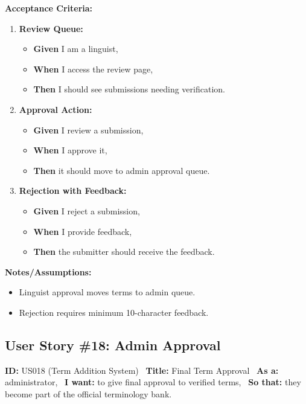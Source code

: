 \documentclass[12pt]{article}
\begin{document}
\vspace{1em}
\textbf{Acceptance Criteria:}
\begin{enumerate}
\item \textbf{Review Queue:}
\begin{itemize}
\item \textbf{Given} I am a linguist,
\item \textbf{When} I access the review page,
\item \textbf{Then} I should see submissions needing verification.
\end{itemize}

\item \textbf{Approval Action:}
\begin{itemize}
    \item \textbf{Given} I review a submission,
    \item \textbf{When} I approve it,
    \item \textbf{Then} it should move to admin approval queue.
\end{itemize}

\item \textbf{Rejection with Feedback:}
\begin{itemize}
    \item \textbf{Given} I reject a submission,
    \item \textbf{When} I provide feedback,
    \item \textbf{Then} the submitter should receive the feedback.
\end{itemize}
\end{enumerate}

\vspace{1em}
\textbf{Notes/Assumptions:}
\begin{itemize}
\item Linguist approval moves terms to admin queue.
\item Rejection requires minimum 10-character feedback.
\end{itemize}

\subsection{User Story \#18: Admin Approval}
\textbf{ID:} US018 (Term Addition System) \
\textbf{Title:} Final Term Approval \
\textbf{As a:} administrator, \
\textbf{I want:} to give final approval to verified terms, \
\textbf{So that:} they become part of the official terminology bank.
\end{document}
